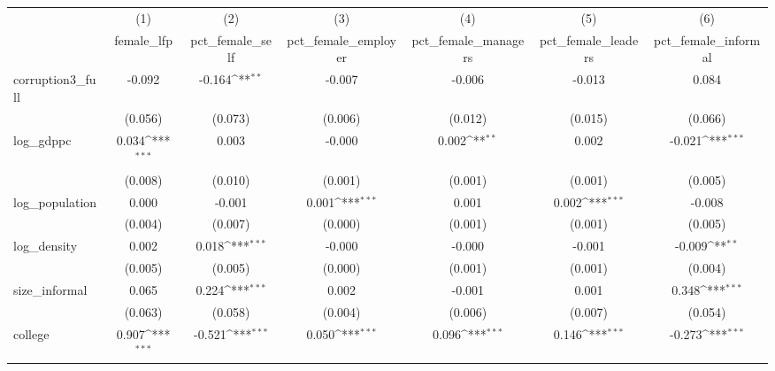{
\def\sym#1{\ifmmode^{#1}\else\(^{#1}\)\fi}
\begin{tabular}{l*{6}{c}}
\hline\hline
            &\multicolumn{1}{c}{(1)}&\multicolumn{1}{c}{(2)}&\multicolumn{1}{c}{(3)}&\multicolumn{1}{c}{(4)}&\multicolumn{1}{c}{(5)}&\multicolumn{1}{c}{(6)}\\
            &\multicolumn{1}{c}{female\_lfp}&\multicolumn{1}{c}{pct\_female\_self}&\multicolumn{1}{c}{pct\_female\_employer}&\multicolumn{1}{c}{pct\_female\_managers}&\multicolumn{1}{c}{pct\_female\_leaders}&\multicolumn{1}{c}{pct\_female\_informal}\\
\hline
corruption3\_full&      -0.092         &      -0.164\sym{**} &      -0.007         &      -0.006         &      -0.013         &       0.084         \\
            &     (0.056)         &     (0.073)         &     (0.006)         &     (0.012)         &     (0.015)         &     (0.066)         \\
[1em]
log\_gdppc   &       0.034\sym{***}&       0.003         &      -0.000         &       0.002\sym{**} &       0.002         &      -0.021\sym{***}\\
            &     (0.008)         &     (0.010)         &     (0.001)         &     (0.001)         &     (0.001)         &     (0.005)         \\
[1em]
log\_population&       0.000         &      -0.001         &       0.001\sym{***}&       0.001         &       0.002\sym{***}&      -0.008         \\
            &     (0.004)         &     (0.007)         &     (0.000)         &     (0.001)         &     (0.001)         &     (0.005)         \\
[1em]
log\_density &       0.002         &       0.018\sym{***}&      -0.000         &      -0.000         &      -0.001         &      -0.009\sym{**} \\
            &     (0.005)         &     (0.005)         &     (0.000)         &     (0.001)         &     (0.001)         &     (0.004)         \\
[1em]
size\_informal&       0.065         &       0.224\sym{***}&       0.002         &      -0.001         &       0.001         &       0.348\sym{***}\\
            &     (0.063)         &     (0.058)         &     (0.004)         &     (0.006)         &     (0.007)         &     (0.054)         \\
[1em]
college     &       0.907\sym{***}&      -0.521\sym{***}&       0.050\sym{***}&       0.096\sym{***}&       0.146\sym{***}&      -0.273\sym{***}\\

\end{tabular}}
